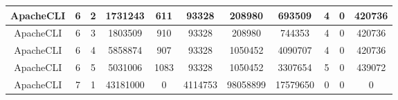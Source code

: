 \begin{table*}[]
\begin{tabular}{@{}ccccccccccc@{}}
        ApacheCLI                                                & 6                                                          & 2    & 1731243                                                     & 611                                                                       & 93328                                                   & 208980                                                     & 693509                                                         & 4                                                         & 0                                                         & 420736  \\ \midrule
        ApacheCLI                                                & 6                                                          & 3    & 1803509                                                     & 910                                                                       & 93328                                                   & 208980                                                     & 744353                                                         & 4                                                         & 0                                                         & 420736  \\ \midrule
        ApacheCLI                                                & 6                                                          & 4    & 5858874                                                     & 907                                                                       & 93328                                                   & 1050452                                                    & 4090707                                                        & 4                                                         & 0                                                         & 420736  \\ \midrule
        ApacheCLI                                                & 6                                                          & 5    & 5031006                                                     & 1083                                                                      & 93328                                                   & 1050452                                                    & 3307654                                                        & 5                                                         & 0                                                         & 439072  \\ \midrule
        ApacheCLI                                                & 7                                                          & 1    & 43181000                                                    & 0                                                                         & 4114753                                                 & 98058899                                                   & 17579650                                                       & 0                                                         & 0                                                         & 0       \\ \midrule

\end{tabular}
\end{table*}
